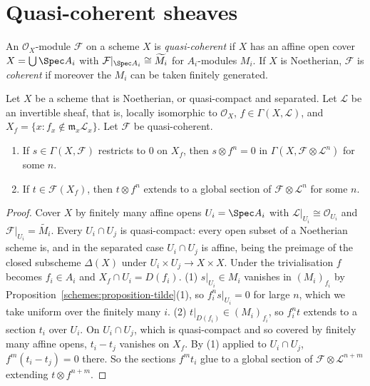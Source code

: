 \section{Quasi-coherent sheaves}\label{schemes:section-quasi-coherent}

\begin{definition}\label{schemes:definition-quasi-coherent}
An $\mathcal{O}_X$-module $\mathcal{F}$ on a scheme $X$ is \emph{quasi-coherent} if $X$ has an affine open cover $X = \bigcup\Spec A_i$ with
$\mathcal{F}|_{\Spec A_i} \cong \widetilde{M_i}$ for $A_i$-modules $M_i$. If $X$ is Noetherian, $\mathcal{F}$ is \emph{coherent} if moreover the $M_i$ can be
taken finitely generated.
\end{definition}

\begin{lemma}\label{schemes:lemma-extend-sections}
Let $X$ be a scheme that is Noetherian, or quasi-compact and separated. Let $\mathcal{L}$ be an invertible sheaf, that is, locally isomorphic to $\mathcal{O}_X$, $f \in \Gamma(X, \mathcal{L})$, and
$X_f = \{x : f_x \notin \mathfrak{m}_x\mathcal{L}_x\}$. Let $\mathcal{F}$ be quasi-coherent.
\begin{enumerate}
\item If $s \in \Gamma(X, \mathcal{F})$ restricts to $0$ on $X_f$, then $s \otimes f^n = 0$ in $\Gamma(X, \mathcal{F} \otimes \mathcal{L}^n)$ for some $n$.
\item If $t \in \mathcal{F}(X_f)$, then $t \otimes f^n$ extends to a global section of $\mathcal{F} \otimes \mathcal{L}^n$ for some $n$.
\end{enumerate}
\end{lemma}

\begin{proof}
Cover $X$ by finitely many affine opens $U_i = \Spec A_i$ with $\mathcal{L}|_{U_i} \cong \mathcal{O}_{U_i}$ and $\mathcal{F}|_{U_i} = \widetilde{M_i}$. Every
$U_i \cap U_j$ is quasi-compact: every open subset of a Noetherian scheme is, and in the separated case $U_i \cap U_j$ is affine, being the preimage of
the closed subscheme $\Delta(X)$ under $U_i \times U_j \to X \times X$. Under the trivialisation $f$ becomes $f_i \in A_i$ and
$X_f \cap U_i = D(f_i)$. (1) $s|_{U_i} \in M_i$ vanishes in $(M_i)_{f_i}$ by Proposition~\ref{schemes:proposition-tilde}(1), so $f_i^ns|_{U_i} = 0$ for
large $n$, which we take uniform over the finitely many $i$. (2) $t|_{D(f_i)} \in (M_i)_{f_i}$, so $f_i^nt$ extends to a section $t_i$ over $U_i$. On
$U_i \cap U_j$, which is quasi-compact and so covered by finitely many affine opens, $t_i - t_j$ vanishes on $X_f$. By (1) applied to $U_i \cap U_j$,
$f^m(t_i - t_j) = 0$ there. So the sections $f^mt_i$ glue to a global section of $\mathcal{F} \otimes \mathcal{L}^{n+m}$ extending $t \otimes f^{n+m}$.
\end{proof}


